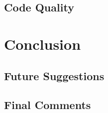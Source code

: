 \documentclass[msc,deptreport, cs]{infthesis}
\begin{document}
\section{Code Quality}

\chapter{Conclusion}

\section{Future Suggestions} 


\section{Final Comments}



\end{document}
